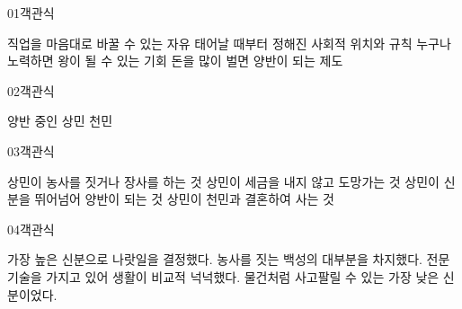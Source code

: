 \documentclass[fs95,seriesFre]{korfarm-base}
\begin{document}
\kfActivityBg \par{}\par\nopagebreak[4]\smallskip\nopagebreak[4]


\begin{kfQBlock}{01}{객관식}
\begin{kfChoices}
\kfChoice 직업을 마음대로 바꿀 수 있는 자유
\kfChoice 태어날 때부터 정해진 사회적 위치와 규칙
\kfChoice 누구나 노력하면 왕이 될 수 있는 기회
\kfChoice 돈을 많이 벌면 양반이 되는 제도
\end{kfChoices}
\end{kfQBlock}
\begin{kfQBlock}{02}{객관식}
\begin{kfChoices}
\kfChoice 양반
\kfChoice 중인
\kfChoice 상민
\kfChoice 천민
\end{kfChoices}
\end{kfQBlock}
\begin{kfQBlock}{03}{객관식}
\begin{kfChoices}
\kfChoice 상민이 농사를 짓거나 장사를 하는 것
\kfChoice 상민이 세금을 내지 않고 도망가는 것
\kfChoice 상민이 신분을 뛰어넘어 양반이 되는 것
\kfChoice 상민이 천민과 결혼하여 사는 것
\end{kfChoices}
\end{kfQBlock}
\begin{kfQBlock}{04}{객관식}
\begin{kfChoices}
\kfChoice 가장 높은 신분으로 나랏일을 결정했다.
\kfChoice 농사를 짓는 백성의 대부분을 차지했다.
\kfChoice 전문 기술을 가지고 있어 생활이 비교적 넉넉했다.
\kfChoice 물건처럼 사고팔릴 수 있는 가장 낮은 신분이었다.
\end{kfChoices}
\end{kfQBlock}
\end{document}
